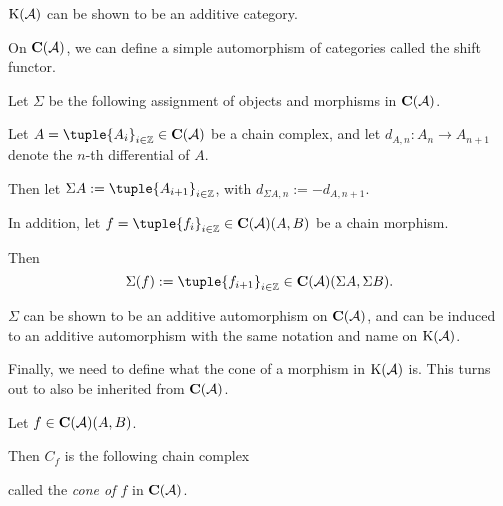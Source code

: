 \( \operatorname{K}({\mathcal{A}}) \) can be shown to be an additive category.

On \( \C(\Ac) \), we can define a simple automorphism of categories called the shift functor.

\begin{definition}
    \label{def:chain_complex_shift}
    Let \( \Sigma \) be the following assignment of objects and morphisms in \( \C(\Ac) \).

    Let \( A = \tuple{A_i}_{i \in \Zb} \in \C(\Ac) \) be a chain complex, and let \( d_{A, n}: A_n \to A_{n + 1} \) denote the \( n \)-th differential of \( A \).

    Then let \( \Sigma A := \tuple{A_{i + 1}}_{i \in \Zb} \), with \( d_{\Sigma A, n} := -d_{A, n + 1} \).

    In addition, let \( f = \tuple{f_i}_{i \in \Zb} \in \C(\Ac)(A, B) \) be a chain morphism.
    
    Then
    \[
        \Sigma(f) := \tuple{f_{i + 1}}_{i \in \Zb} \in \C(\Ac)(\Sigma A, \Sigma B).
    \]
\end{definition}

\( \Sigma \) can be shown to be an additive automorphism on \( \C(\Ac) \), and can be induced to an additive automorphism with the same notation and name on \( \operatorname{K}({\mathcal{A}}) \).

Finally, we need to define what the cone of a morphism in \( \operatorname{K}({\mathcal{A}}) \) is. This turns out to also be inherited from \( \C(\Ac) \).

\begin{definition}[Cone in \( \C(\Ac) \)]
    Let \( f \in \operatorname{\mathbf{C}}({\mathcal{A}})(A, B) \).

    Then \( C_f \) is the following chain complex
    \begin{center}
    \end{center}
    called the \emph{cone of \( f \)} in \( \C(\Ac) \).
\end{definition}

